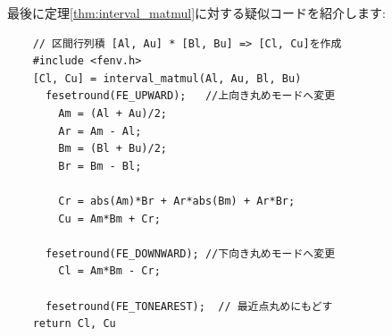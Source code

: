 最後に定理\ref{thm:interval_matmul}に対する疑似コードを紹介します:
\begin{verbatim}
	// 区間行列積 [Al, Au] * [Bl, Bu] => [Cl, Cu]を作成
	#include <fenv.h>
	[Cl, Cu] = interval_matmul(Al, Au, Bl, Bu)
	  fesetround(FE_UPWARD);   //上向き丸めモードへ変更
	    Am = (Al + Au)/2;
	    Ar = Am - Al;
	    Bm = (Bl + Bu)/2;
	    Br = Bm - Bl;

	    Cr = abs(Am)*Br + Ar*abs(Bm) + Ar*Br;
	    Cu = Am*Bm + Cr;

	  fesetround(FE_DOWNWARD); //下向き丸めモードへ変更
	    Cl = Am*Bm - Cr;

	  fesetround(FE_TONEAREST);  // 最近点丸めにもどす
	return Cl, Cu
\end{verbatim}


%
